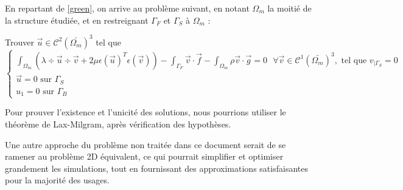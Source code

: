 En repartant de \ref{green}, on arrive au problème suivant, en notant $\Omega_m$ la moitié de la structure étudiée, et en restreignant $\Gamma_F$ et $\Gamma_S$ à $\Omega_m$ :

Trouver $\vec{u} \in \mathcal{C}^2(\bar{\Omega_m})^3$ tel que
\begin{equation}\label{moitie}
    \begin{cases}
        \displaystyle\int_{\Omega_m} (\lambda \div \vec{u} \div \vec{v} + 2\mu \epsilon(\vec{u})^T \epsilon(\vec{v})) - \int_{\Gamma_F} \vec{v} \cdot \vec{f} - \int_{\Omega_m} \rho \vec{v} \cdot \vec{g} = 0 \textrm{ } \forall \vec{v} \in \mathcal{C}^1(\bar{\Omega_m})^3, \textrm{ tel que } v_{|\Gamma_S} = 0\\
        \vec{u} = 0 \textrm{ sur } \Gamma_S\\
        u_1 = 0 \textrm{ sur } \Gamma_B
    \end{cases}
\end{equation}

Pour prouver l'existence et l'unicité des solutions, nous pourrions utiliser le théorème de Lax-Milgram, après vérification des hypothèses.

Une autre approche du problème non traitée dans ce document serait de se ramener au problème 2D équivalent, ce qui pourrait simplifier et optimiser grandement les simulations,
tout en fournissant des approximations satisfaisantes pour la majorité des usages.

